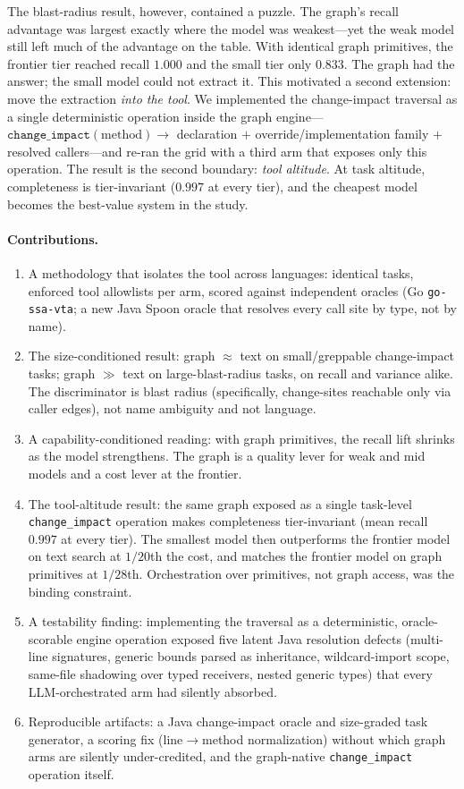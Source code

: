 \documentclass[11pt]{article}
\newcommand{\code}[1]{\texttt{#1}}
\begin{document}
The blast-radius result, however, contained a puzzle. The graph's recall
advantage was largest exactly where the model was weakest---yet the weak model
still left much of the advantage on the table. With identical graph primitives,
the frontier tier reached recall $1.000$ and the small tier only $0.833$. The
graph had the answer; the small model could not extract it. This motivated a
second extension: move the extraction \emph{into the tool}. We implemented the
change-impact traversal as a single deterministic operation inside the graph
engine---$\code{change\_impact}(\text{method}) \rightarrow$ declaration $+$
override/implementation family $+$ resolved callers---and re-ran the grid with a
third arm that exposes only this operation. The result is the second boundary:
\emph{tool altitude}. At task altitude, completeness is tier-invariant
($0.997$ at every tier), and the cheapest model becomes the best-value system in
the study.

\paragraph{Contributions.}
\begin{enumerate}[leftmargin=*]
\item A methodology that isolates the tool across languages: identical
tasks, enforced tool allowlists per arm, scored against independent
oracles (Go \code{go-ssa-vta}; a new Java Spoon oracle that resolves every call
site by type, not by name).
\item The size-conditioned result: graph $\approx$ text on
small/greppable change-impact tasks; graph $\gg$ text on large-blast-radius
tasks, on recall and variance alike. The discriminator is blast radius
(specifically, change-sites reachable only via caller edges), not name
ambiguity and not language.
\item A capability-conditioned reading: with graph primitives,
the recall lift shrinks as the model strengthens. The graph is a quality lever
for weak and mid models and a cost lever at the frontier.
\item The tool-altitude result: the same graph exposed as a single
task-level \code{change\_impact} operation makes completeness tier-invariant
(mean recall $0.997$ at every tier). The smallest model then outperforms the
frontier model on text search at $1/20$th the cost, and matches the frontier
model on graph primitives at $1/28$th. Orchestration over primitives, not graph
access, was the binding constraint.
\item A testability finding: implementing the traversal as a
deterministic, oracle-scorable engine operation exposed five latent Java
resolution defects (multi-line signatures, generic bounds parsed as inheritance,
wildcard-import scope, same-file shadowing over typed receivers, nested generic
types) that every LLM-orchestrated arm had silently absorbed.
\item Reproducible artifacts: a Java change-impact oracle and
size-graded task generator, a scoring fix (line$\rightarrow$method
normalization) without which graph arms are silently under-credited, and the
graph-native \code{change\_impact} operation itself.
\end{enumerate}
\end{document}
